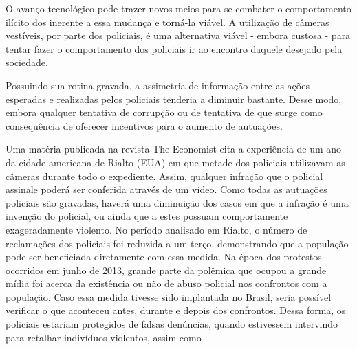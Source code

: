 \documentclass[
	article,			%
	12pt,				%
	oneside,			%
	a4paper,			%
	english,			%
	brazil,				%
	]{abntex2}
\begin{document}
O avanço tecnológico pode trazer novos meios para se combater o comportamento ilícito dos inerente a essa mudança e torná-la viável. A utilização de câmeras vestíveis, por parte dos policiais, é uma alternativa viável - embora custosa - para tentar fazer o comportamento dos policiais ir ao encontro daquele desejado pela sociedade.

Possuindo sua rotina gravada, a assimetria de informação entre as ações esperadas e realizadas pelos policiais tenderia a diminuir bastante. Desse modo, embora 
qualquer tentativa de corrupção ou de tentativa de  que surge como consequência de oferecer incentivos para o aumento de autuações. 

Uma matéria publicada na revista The Economist \cite{theeconomist} cita a experiência de um ano da cidade americana de Rialto (EUA) em que metade dos policiais utilizavam as câmeras durante todo o expediente. Assim, qualquer infração que o policial assinale poderá ser conferida através de um vídeo. Como todas as autuações policiais são gravadas, haverá uma diminuição dos casos em que a infração é uma invenção do policial, ou ainda que a estes possuam comportamente exageradamente violento.
No período analisado em Rialto, o número de reclamações dos policiais foi reduzida a um terço, demonstrando que a população pode ser beneficiada diretamente com essa medida.
Na época dos protestos ocorridos em junho de 2013, grande parte da polêmica que ocupou a grande mídia foi acerca da existência ou não de abuso policial nos confrontos com a população. Caso essa medida tivesse sido implantada no Brasil, seria possível verificar o que aconteceu antes, durante e depois dos confrontos. Dessa forma, os policiais estariam protegidos de falsas denúncias, quando estivessem intervindo para retalhar indivíduos violentos, assim como 

\frenchspacing 


%
%
\maketitle
\end{document}
